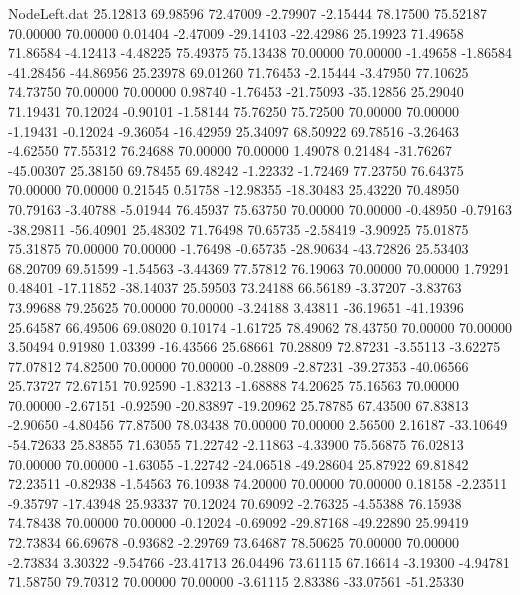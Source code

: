 \begin{filecontents}{NodeLeft.dat}
  25.12813   69.98596   72.47009    -2.79907   -2.15444   78.17500   75.52187   70.00000   70.00000    0.01404   -2.47009  -29.14103  -22.42986
  25.19923   71.49658   71.86584    -4.12413   -4.48225   75.49375   75.13438   70.00000   70.00000   -1.49658   -1.86584  -41.28456  -44.86956
  25.23978   69.01260   71.76453    -2.15444   -3.47950   77.10625   74.73750   70.00000   70.00000    0.98740   -1.76453  -21.75093  -35.12856
  25.29040   71.19431   70.12024    -0.90101   -1.58144   75.76250   75.72500   70.00000   70.00000   -1.19431   -0.12024   -9.36054  -16.42959
  25.34097   68.50922   69.78516    -3.26463   -4.62550   77.55312   76.24688   70.00000   70.00000    1.49078    0.21484  -31.76267  -45.00307
  25.38150   69.78455   69.48242    -1.22332   -1.72469   77.23750   76.64375   70.00000   70.00000    0.21545    0.51758  -12.98355  -18.30483
  25.43220   70.48950   70.79163    -3.40788   -5.01944   76.45937   75.63750   70.00000   70.00000   -0.48950   -0.79163  -38.29811  -56.40901
  25.48302   71.76498   70.65735    -2.58419   -3.90925   75.01875   75.31875   70.00000   70.00000   -1.76498   -0.65735  -28.90634  -43.72826
  25.53403   68.20709   69.51599    -1.54563   -3.44369   77.57812   76.19063   70.00000   70.00000    1.79291    0.48401  -17.11852  -38.14037
  25.59503   73.24188   66.56189    -3.37207   -3.83763   73.99688   79.25625   70.00000   70.00000   -3.24188    3.43811  -36.19651  -41.19396
  25.64587   66.49506   69.08020     0.10174   -1.61725   78.49062   78.43750   70.00000   70.00000    3.50494    0.91980    1.03399  -16.43566
  25.68661   70.28809   72.87231    -3.55113   -3.62275   77.07812   74.82500   70.00000   70.00000   -0.28809   -2.87231  -39.27353  -40.06566
  25.73727   72.67151   70.92590    -1.83213   -1.68888   74.20625   75.16563   70.00000   70.00000   -2.67151   -0.92590  -20.83897  -19.20962
  25.78785   67.43500   67.83813    -2.90650   -4.80456   77.87500   78.03438   70.00000   70.00000    2.56500    2.16187  -33.10649  -54.72633
  25.83855   71.63055   71.22742    -2.11863   -4.33900   75.56875   76.02813   70.00000   70.00000   -1.63055   -1.22742  -24.06518  -49.28604
  25.87922   69.81842   72.23511    -0.82938   -1.54563   76.10938   74.20000   70.00000   70.00000    0.18158   -2.23511   -9.35797  -17.43948
  25.93337   70.12024   70.69092    -2.76325   -4.55388   76.15938   74.78438   70.00000   70.00000   -0.12024   -0.69092  -29.87168  -49.22890
  25.99419   72.73834   66.69678    -0.93682   -2.29769   73.64687   78.50625   70.00000   70.00000   -2.73834    3.30322   -9.54766  -23.41713
  26.04496   73.61115   67.16614    -3.19300   -4.94781   71.58750   79.70312   70.00000   70.00000   -3.61115    2.83386  -33.07561  -51.25330

\end{filecontents}
